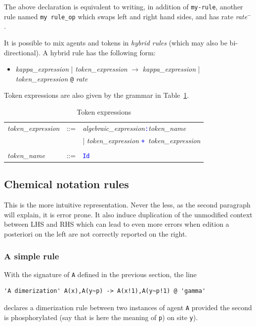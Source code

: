 \documentclass[11pt]{book}
\def\tcb#1{\textcolor{blue}{\ttt{#1}}}
\def\ttt#1{\texttt{#1}}
\def\var#1{{\textquotesingle}#1{\textquotesingle}}
\def\rar{\rightarrow}
\def\ITE#1{\begin{itemize}#1\end{itemize}}
\def\imp#1{\emph{#1}\index{#1}}
\begin{document}
The above declaration is equivalent to
writing, in addition of \ttt{\var{my-rule}}, another rule named
\ttt{\var{my rule\_op}} which swaps left and right hand sides, and has
rate \textit{rate$^-$}.

It is possible to mix
agents and tokens in \imp{hybrid rules} (which may also be
bi-directional). A hybrid rule has the following form:

\ITE{
\item[] {\it kappa\_expression} | {\it token\_expression} $\rar$ {\it kappa\_expression}  | {\it token\_expression }\ttt{@} {\it rate}
}

Token expressions are also given by the grammar in
Table~\ref{tab:tokens}.
\begin{table}[ht!]
  \centering
  \caption{Token expressions}
  \begin{tabular}{@{} lcl @{}}
   \textit{token\_expression} &::=&  \textit{algebraic\_expression}\tcb{:}\textit{token\_name} \\
	&&|  \textit{token\_expression} \tcb{+}\ \textit{token\_expression} \\\\
   \textit{token\_name} &::=& \tcb{Id}\\
  \end{tabular}
  \label{tab:tokens}
\end{table}

\subsection{Chemical notation rules}

This is the more intuitive representation. Never the less, as the
second paragraph will explain, it is error prone. It also induce
duplication of the unmodified context between LHS and RHS which can
lead to even more errors when edition a posteriori on the left are not
correctly reported on the right.

\subsubsection*{A simple rule}
With the signature of \ttt{A} defined in the
previous section, the line
\begin{lstlisting}[language=kappa]
'A dimerization' A(x),A(y~p) -> A(x!1),A(y~p!1) @ 'gamma'
\end{lstlisting}
declares a dimerization rule between two instances of agent \ttt{A}
provided the second is phosphorylated (say that is here the meaning of
\ttt{p}) on site \ttt{y}).
\end{document}
